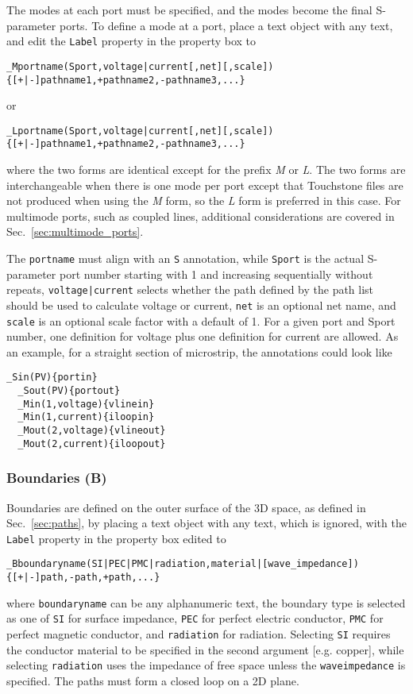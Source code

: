 \documentclass[titlepage]{article}
\renewcommand\_{\textunderscore\linebreak[1]}
\begin{document}
The modes at each port must be specified, and the modes become the final S-parameter ports.  To define a mode at a port, place a text object with any text, and edit the \texttt{Label} property in the property box to
\begin{Verbatim}[fontsize=\small]
  _Mportname(Sport,voltage|current[,net][,scale]){[+|-]pathname1,+pathname2,-pathname3,...}
\end{Verbatim}
\noindent or
\begin{Verbatim}[fontsize=\small]
  _Lportname(Sport,voltage|current[,net][,scale]){[+|-]pathname1,+pathname2,-pathname3,...}
\end{Verbatim}
\noindent where the two forms are identical except for the prefix \textit{\_M} or \textit{\_L}.  The two forms are interchangeable when there is one mode per port except that Touchstone files are not produced when using the \textit{\_M} form, so the \textit{\_L} form is preferred in this case.  For multimode ports, such as coupled lines, additional considerations are covered in Sec.~\ref{sec:multimode_ports}.
  
The \texttt{portname} must align with an \texttt{\_S} annotation, while \texttt{Sport} is the actual S-parameter port number starting with 1 and increasing sequentially without repeats, \texttt{voltage|current} selects whether the path defined by the path list should be used to calculate voltage or current, \texttt{net} is an optional net name, and \texttt{scale} is an optional scale factor with a default of 1.  For a given port and Sport number, one definition for voltage plus one definition for current are allowed.  As an example, for a straight section of microstrip, the annotations could look like
\begin{Verbatim}[fontsize=\small]
  _Sin(PV){portin}
  _Sout(PV){portout}
  _Min(1,voltage){vlinein}
  _Min(1,current){iloopin}
  _Mout(2,voltage){vlineout}
  _Mout(2,current){iloopout}
\end{Verbatim}

\subsubsection{Boundaries (\_B)}

Boundaries are defined on the outer surface of the 3D space, as defined in Sec.~\ref{sec:paths}, by placing a text object with any text, which is ignored, with the \texttt{Label} property in the property box edited to
\begin{Verbatim}[fontsize=\small]
  _Bboundaryname(SI|PEC|PMC|radiation,material|[wave_impedance]){[+|-]path,-path,+path,...}
\end{Verbatim}
\noindent where \texttt{boundaryname} can be any alphanumeric text, the boundary type is selected as one of \texttt{SI} for surface impedance, \texttt{PEC} for perfect electric conductor, \texttt{PMC} for perfect magnetic conductor, and \texttt{radiation} for radiation.  Selecting \texttt{SI} requires the conductor material to be specified in the second argument [e.g. copper], while selecting \texttt{radiation} uses the impedance of free space unless the \texttt{wave\_impedance} is specified.  The paths must form a closed loop on a 2D plane.
\end{document}
